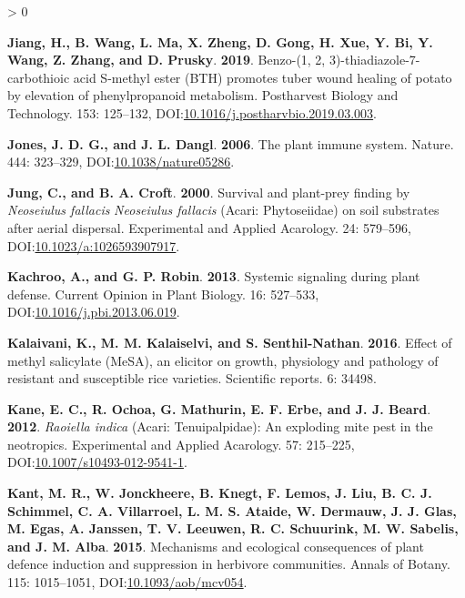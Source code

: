 \documentclass{ufdissertation}[overrideChapters] %
\newlength{\cslhangindent}
\newenvironment{CSLReferences}[2] %
 {%
  \setlength{\parindent}{0pt}
  \ifodd #1 \everypar{\setlength{\hangindent}{\cslhangindent}}\ignorespaces\fi
  \ifnum #2 > 0
  \setlength{\parskip}{#2\baselineskip}
  \fi
 }%
 {}
\begin{document}
{\begin{CSLReferences}{1}{1}
\leavevmode{}%
\textbf{Jiang, H., B. Wang, L. Ma, X. Zheng, D. Gong, H. Xue, Y. Bi, Y. Wang, Z. Zhang, and D. Prusky}. \textbf{2019}. Benzo-(1, 2, 3)-thiadiazole-7-carbothioic acid {S}-methyl ester ({BTH}) promotes tuber wound healing of potato by elevation of phenylpropanoid metabolism. Postharvest Biology and Technology. 153: 125--132, DOI:\href{https://doi.org/10.1016/j.postharvbio.2019.03.003}{10.1016/j.postharvbio.2019.03.003}.

\leavevmode{}%
\textbf{Jones, J. D. G., and J. L. Dangl}. \textbf{2006}. The plant immune system. Nature. 444: 323--329, DOI:\href{https://doi.org/10.1038/nature05286}{10.1038/nature05286}.

\leavevmode{}%
\textbf{Jung, C., and B. A. Croft}. \textbf{2000}. Survival and plant-prey finding by {\emph{Neoseiulus fallacis}} {\emph{Neoseiulus fallacis}} ({Acari}: {Phytoseiidae}) on soil substrates after aerial dispersal. Experimental and Applied Acarology. 24: 579--596, DOI:\href{https://doi.org/10.1023/a:1026593907917}{10.1023/a:1026593907917}.

\leavevmode{}%
\textbf{Kachroo, A., and G. P. Robin}. \textbf{2013}. Systemic signaling during plant defense. Current Opinion in Plant Biology. 16: 527--533, DOI:\href{https://doi.org/10.1016/j.pbi.2013.06.019}{10.1016/j.pbi.2013.06.019}.

\leavevmode{}%
\textbf{Kalaivani, K., M. M. Kalaiselvi, and S. Senthil-Nathan}. \textbf{2016}. Effect of methyl salicylate {(MeSA)}, an elicitor on growth, physiology and pathology of resistant and susceptible rice varieties. Scientific reports. 6: 34498.

\leavevmode{}%
\textbf{Kane, E. C., R. Ochoa, G. Mathurin, E. F. Erbe, and J. J. Beard}. \textbf{2012}. {\emph{Raoiella indica}} ({Acari}: {Tenuipalpidae}): An exploding mite pest in the neotropics. Experimental and Applied Acarology. 57: 215--225, DOI:\href{https://doi.org/10.1007/s10493-012-9541-1}{10.1007/s10493-012-9541-1}.

\leavevmode{}%
\textbf{Kant, M. R., W. Jonckheere, B. Knegt, F. Lemos, J. Liu, B. C. J. Schimmel, C. A. Villarroel, L. M. S. Ataide, W. Dermauw, J. J. Glas, M. Egas, A. Janssen, T. V. Leeuwen, R. C. Schuurink, M. W. Sabelis, and J. M. Alba}. \textbf{2015}. Mechanisms and ecological consequences of plant defence induction and suppression in herbivore communities. Annals of Botany. 115: 1015--1051, DOI:\href{https://doi.org/10.1093/aob/mcv054}{10.1093/aob/mcv054}.


\end{CSLReferences}}
\end{document}
